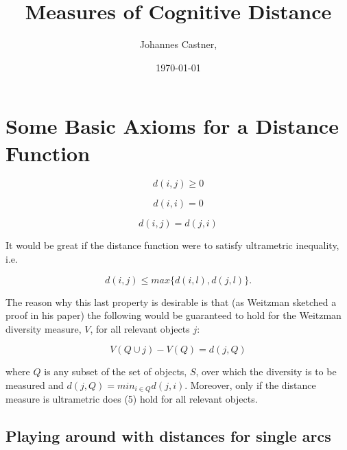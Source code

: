 \documentclass[12pt]{article}
\begin{document}
%

\title{Measures of Cognitive Distance}			%
\author{Johannes  Castner, }		%
\date \today	
\maketitle

\section{Some Basic Axioms for a Distance Function}

\begin{equation}
d(i, j)\geq 0
\end{equation}

\begin{equation}
d(i, i)= 0
\end{equation}

\begin{equation}
d(i, j)=d(j, i)
\end{equation}

It would be great if the distance function were to satisfy ultrametric inequality, i.e.

\begin{equation}
d(i, j)\leq max \lbrace d(i, l), d(j, l) \rbrace.
\end{equation}

The reason why this last property is desirable is that (as Weitzman sketched a proof in his paper) the following would be guaranteed to hold for the Weitzman diversity measure, $V$, for all relevant objects $j$:

\begin{equation}
V(Q \cup j)-V(Q) = d(j, Q)
\end{equation}

where $Q$ is any subset of the set of objects, $S$, over which the diversity is to be measured and $d(j, Q)=min_{i\in Q} d(j, i)$.  Moreover, only if the distance measure is ultrametric does (5) hold for all relevant objects.     

\subsection{Playing around with distances for single arcs}
\end{document}
